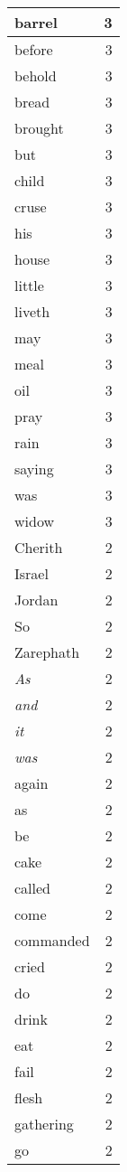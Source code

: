 \begin{center}
\begin{longtable}{l|r}
barrel & 3 \\ \hline
before & 3 \\ \hline
behold & 3 \\ \hline
bread & 3 \\ \hline
brought & 3 \\ \hline
but & 3 \\ \hline
child & 3 \\ \hline
cruse & 3 \\ \hline
his & 3 \\ \hline
house & 3 \\ \hline
little & 3 \\ \hline
liveth & 3 \\ \hline
may & 3 \\ \hline
meal & 3 \\ \hline
oil & 3 \\ \hline
pray & 3 \\ \hline
rain & 3 \\ \hline
saying & 3 \\ \hline
was & 3 \\ \hline
widow & 3 \\ \hline
Cherith & 2 \\ \hline
Israel & 2 \\ \hline
Jordan & 2 \\ \hline
So & 2 \\ \hline
Zarephath & 2 \\ \hline
\emph{As} & 2 \\ \hline
\emph{and} & 2 \\ \hline
\emph{it} & 2 \\ \hline
\emph{was} & 2 \\ \hline
again & 2 \\ \hline
as & 2 \\ \hline
be & 2 \\ \hline
cake & 2 \\ \hline
called & 2 \\ \hline
come & 2 \\ \hline
commanded & 2 \\ \hline
cried & 2 \\ \hline
do & 2 \\ \hline
drink & 2 \\ \hline
eat & 2 \\ \hline
fail & 2 \\ \hline
flesh & 2 \\ \hline
gathering & 2 \\ \hline
go & 2 \\ \hline

\end{longtable}
\end{center}
